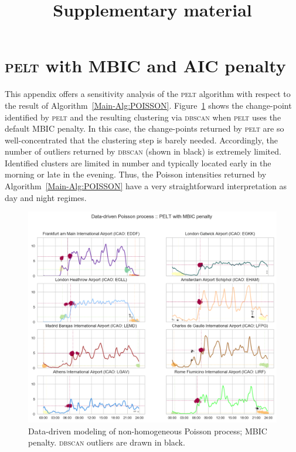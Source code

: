 \documentclass[]{elsarticle}
\newcommand{\PELT}{\textsc{pelt}}
\newcommand{\DBSCAN}{\textsc{dbscan}}
\begin{document}
\begin{frontmatter}

\title{Supplementary material}

\end{frontmatter}

\appendix

\section{\PELT{} with \acs{MBIC} and \acs{AIC} penalty}\label{sec:appa}

  This appendix offers a sensitivity analysis of the \PELT{} algorithm with respect to the result of Algorithm~\ref{Main-Alg:POISSON}.
  Figure~\ref{fig:DD_MBIC} shows the change-point identified by \PELT{} and the resulting clustering via \DBSCAN{} when \PELT{} uses the default \ac{MBIC} penalty.
  In this case, the change-points returned by \PELT{} are so well-concentrated that the clustering step is barely needed.
  Accordingly, the number of outliers returned by \DBSCAN{} (shown in black) is extremely limited.
  Identified clusters are limited in number and typically located early in the morning or late in the evening.
  Thus, the Poisson intensities returned by Algorithm~\ref{Main-Alg:POISSON} have a very straightforward interpretation as day and night regimes.

  \begin{figure}
      \includegraphics[width=\textwidth]{DDPoisson_MBIC}
      \caption{Data-driven modeling of non-homogeneous Poisson process; \ac{MBIC} penalty. \DBSCAN{} outliers are drawn in black.}\label{fig:DD_MBIC}
  \end{figure}
\end{document}
